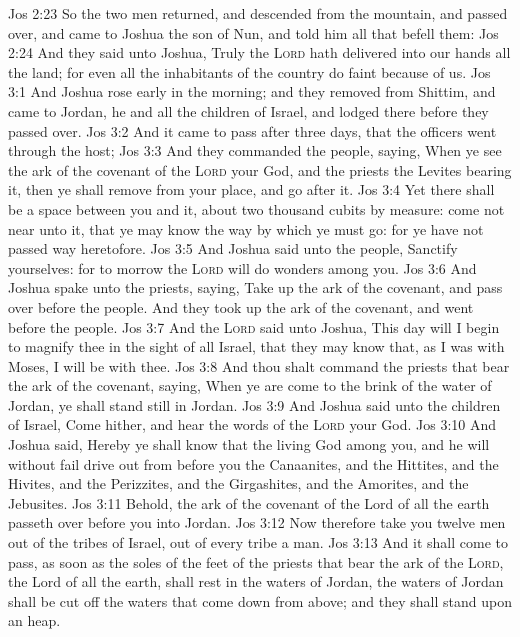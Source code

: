\vs Jos 2:23 So the two men returned, and descended from the mountain, and passed over, and came to Joshua the son of Nun, and told him all  that befell them:
\vs Jos 2:24 And they said unto Joshua, Truly the \textsc{Lord} hath delivered into our hands all the land; for even all the inhabitants of the country do faint because of us.
\vs Jos 3:1 And Joshua rose early in the morning; and they removed from Shittim, and came to Jordan, he and all the children of Israel, and lodged there before they passed over.
\vs Jos 3:2 And it came to pass after three days, that the officers went through the host;
\vs Jos 3:3 And they commanded the people, saying, When ye see the ark of the covenant of the \textsc{Lord} your God, and the priests the Levites bearing it, then ye shall remove from your place, and go after it.
\vs Jos 3:4 Yet there shall be a space between you and it, about two thousand cubits by measure: come not near unto it, that ye may know the way by which ye must go: for ye have not passed  way heretofore.
\vs Jos 3:5 And Joshua said unto the people, Sanctify yourselves: for to morrow the \textsc{Lord} will do wonders among you.
\vs Jos 3:6 And Joshua spake unto the priests, saying, Take up the ark of the covenant, and pass over before the people. And they took up the ark of the covenant, and went before the people.
\vs Jos 3:7 And the \textsc{Lord} said unto Joshua, This day will I begin to magnify thee in the sight of all Israel, that they may know that, as I was with Moses,  I will be with thee.
\vs Jos 3:8 And thou shalt command the priests that bear the ark of the covenant, saying, When ye are come to the brink of the water of Jordan, ye shall stand still in Jordan.
\vs Jos 3:9 And Joshua said unto the children of Israel, Come hither, and hear the words of the \textsc{Lord} your God.
\vs Jos 3:10 And Joshua said, Hereby ye shall know that the living God  among you, and  he will without fail drive out from before you the Canaanites, and the Hittites, and the Hivites, and the Perizzites, and the Girgashites, and the Amorites, and the Jebusites.
\vs Jos 3:11 Behold, the ark of the covenant of the Lord of all the earth passeth over before you into Jordan.
\vs Jos 3:12 Now therefore take you twelve men out of the tribes of Israel, out of every tribe a man.
\vs Jos 3:13 And it shall come to pass, as soon as the soles of the feet of the priests that bear the ark of the \textsc{Lord}, the Lord of all the earth, shall rest in the waters of Jordan,  the waters of Jordan shall be cut off  the waters that come down from above; and they shall stand upon an heap.
